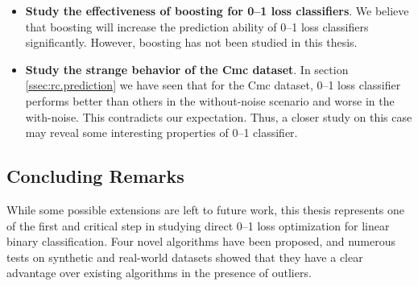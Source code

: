 \begin{itemize}
\item {\bf Study the effectiveness of boosting for 0--1 loss classifiers}. We believe that boosting will increase the prediction ability of 0--1 loss classifiers significantly. However, boosting has not been studied in this thesis.

\item {\bf Study the strange behavior of the Cmc dataset}. In section \ref{ssec:rc.prediction} we have seen that for the Cmc dataset, 0--1 loss classifier performs better than others in the without-noise scenario and worse in the with-noise. This contradicts our expectation. Thus, a closer study on this case may reveal some interesting properties of 0--1 classifier.

\end{itemize}

\subsection{Concluding Remarks}

While some possible extensions are left to future work, this thesis represents one of the first and critical step in studying direct 0--1 loss optimization for linear binary classification. Four novel algorithms have been proposed, and numerous tests on synthetic and real-world datasets showed that they have a clear advantage over existing algorithms in the presence of outliers.

